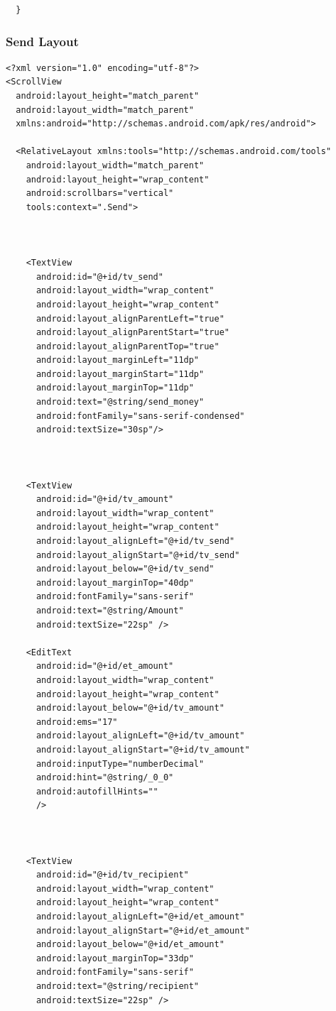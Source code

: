 \documentclass[11pt, a4paper]{article}
\begin{document}
\begin{appendices}
\begin{lstlisting}
  }
\end{lstlisting}
\subsubsection{Send Layout}
\begin{lstlisting}
<?xml version="1.0" encoding="utf-8"?>
<ScrollView
  android:layout_height="match_parent"
  android:layout_width="match_parent"
  xmlns:android="http://schemas.android.com/apk/res/android">

  <RelativeLayout xmlns:tools="http://schemas.android.com/tools"
    android:layout_width="match_parent"
    android:layout_height="wrap_content"
    android:scrollbars="vertical"
    tools:context=".Send">



    <TextView
      android:id="@+id/tv_send"
      android:layout_width="wrap_content"
      android:layout_height="wrap_content"
      android:layout_alignParentLeft="true"
      android:layout_alignParentStart="true"
      android:layout_alignParentTop="true"
      android:layout_marginLeft="11dp"
      android:layout_marginStart="11dp"
      android:layout_marginTop="11dp"
      android:text="@string/send_money"
      android:fontFamily="sans-serif-condensed"
      android:textSize="30sp"/>



    <TextView
      android:id="@+id/tv_amount"
      android:layout_width="wrap_content"
      android:layout_height="wrap_content"
      android:layout_alignLeft="@+id/tv_send"
      android:layout_alignStart="@+id/tv_send"
      android:layout_below="@+id/tv_send"
      android:layout_marginTop="40dp"
      android:fontFamily="sans-serif"
      android:text="@string/Amount"
      android:textSize="22sp" />

    <EditText
      android:id="@+id/et_amount"
      android:layout_width="wrap_content"
      android:layout_height="wrap_content"
      android:layout_below="@+id/tv_amount"
      android:ems="17"
      android:layout_alignLeft="@+id/tv_amount"
      android:layout_alignStart="@+id/tv_amount"
      android:inputType="numberDecimal"
      android:hint="@string/_0_0"
      android:autofillHints=""
      />



    <TextView
      android:id="@+id/tv_recipient"
      android:layout_width="wrap_content"
      android:layout_height="wrap_content"
      android:layout_alignLeft="@+id/et_amount"
      android:layout_alignStart="@+id/et_amount"
      android:layout_below="@+id/et_amount"
      android:layout_marginTop="33dp"
      android:fontFamily="sans-serif"
      android:text="@string/recipient"
      android:textSize="22sp" />


\end{lstlisting}
\end{appendices}
\end{document}
